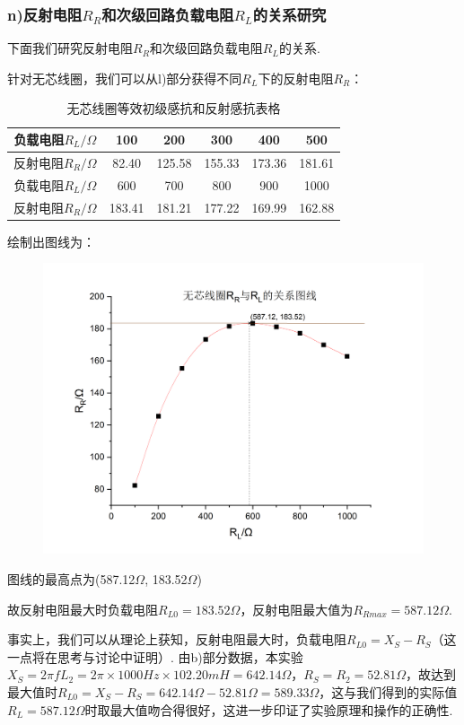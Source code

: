 \documentclass[UTF8]{ctexart}
\begin{document}
\subsubsection*{n)反射电阻$R_R$和次级回路负载电阻$R_L$的关系研究}
下面我们研究反射电阻$R_R$和次级回路负载电阻$R_L$的关系.\par
针对无芯线圈，我们可以从l)部分获得不同$R_L$下的反射电阻$R_R$：
\begin{table}[H]\begin{center}
        \caption{无芯线圈等效初级感抗和反射感抗表格}
        \begin{tabular}{|c|c|c|c|c|c|}
            \hline
            负载电阻$R_L/\Omega$&100&200&300&400&500\\           
            \hline
            反射电阻$R_R/\Omega$&82.40&125.58&155.33&173.36&181.61\\
            \hline
            \hline
            负载电阻$R_L/\Omega$&600&700&800&900&1000\\
            \hline
            反射电阻$R_R/\Omega$&183.41&181.21&177.22&169.99&162.88\\
            \hline
        \end{tabular}
    \restoregeometry
\end{center}\end{table}
绘制出图线为：
\begin{figure}[H]\begin{center}
    \includegraphics*[scale = 0.5]{graph3.png}
\end{center}\end{figure}
图线的最高点为(587.12$\Omega$, 183.52$\Omega$)\par
故反射电阻最大时负载电阻$R_{L0}=183.52\Omega$，反射电阻最大值为$R_{Rmax}=587.12\Omega$.\par
事实上，我们可以从理论上获知，反射电阻最大时，负载电阻$R_{L0}=X_S-R_S$（这一点将在思考与讨论中证明）. 由b)部分数据，本实验$X_S=2\pi fL_2=2\pi\times 1000Hz \times 102.20mH=642.14\Omega$，$R_S=R_2=52.81\Omega$，故达到最大值时$R_{L0}=X_S-R_S=642.14\Omega-52.81\Omega=589.33\Omega$，这与我们得到的实际值$R_L=587.12\Omega$时取最大值吻合得很好，这进一步印证了实验原理和操作的正确性.
\end{document}
